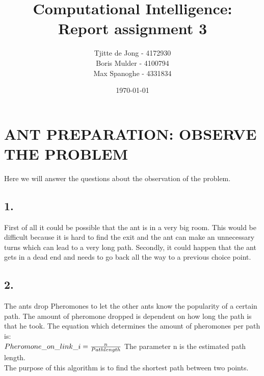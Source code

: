 \documentclass{scrartcl}
\begin{document}
\title{Computational Intelligence:
\\Report assignment 3}
\date{\today{}}

\author{
    \begin{tabular}{l r}
    	\\Tjitte de Jong - 4172930
	\\Boris Mulder - 4100794
        \\Max Spanoghe - 4331834
            \end{tabular}
  }
  
\maketitle \thispagestyle{empty} \pagebreak
  
\section*{ANT PREPARATION: OBSERVE THE PROBLEM}
  Here we will answer the questions about the observation of the problem.
  
\subsection*{1.}
First of all it could be possible that the ant is in a very big room. This would be difficult because it is hard to find the exit and the ant can make an unnecessary turns which can lead to a very long path.
Secondly, it could happen that the ant gets in a dead end and needs to go back all the way to a previous choice point.

\subsection*{2.}
The ants drop Pheromones to let the other ants know the popularity of a certain path. The amount of pheromone dropped is dependent on how long the path is that he took. The equation which determines the amount of pheromones per path is: \\
$Pheromone\char`_on\char`_link\char`_i = \frac{n}{Path length}$
The parameter n is the estimated path length. \\
The purpose of this algorithm is to find the shortest path between two points.
\end{document}
